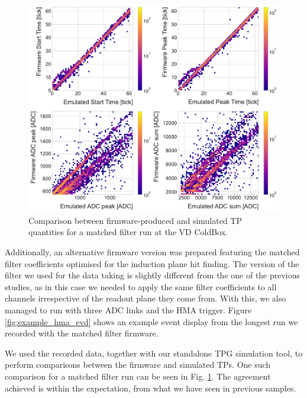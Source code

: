 \begin{figure}[t]
    \centering
    \includegraphics[scale = 0.5]{Images/Matched_Filter/np02_coldbox_tp_comp.pdf}
    \caption[Comparison between firmware-produced and simulated TP quantities for a matched filter run at the VD ColdBox.]{Comparison between firmware-produced and simulated TP quantities for a matched filter run at the VD ColdBox.}
    \label{fig:vdcoldbox_tp_comp}
\end{figure}

Additionally, an alternative firmware version was prepared featuring the matched filter coefficients optimised for the induction plane hit finding. The version of the filter we used for the data taking is slightly different from the one of the previous studies, as in this case we needed to apply the same filter coefficients to all channels irrespective of the readout plane they come from. With this, we also managed to run with three ADC links and the HMA trigger. Figure \ref{fig:example_hma_evd} shows an example event display from the longest run we recorded with the matched filter firmware.

We used the recorded data, together with our standalone TPG simulation tool, to perform comparisons between the firmware and simulated TPs. One such comparison for a matched filter run can be seen in Fig. \ref{fig:vdcoldbox_tp_comp}. The agreement achieved is within the expectation, from what we have seen in previous samples.

